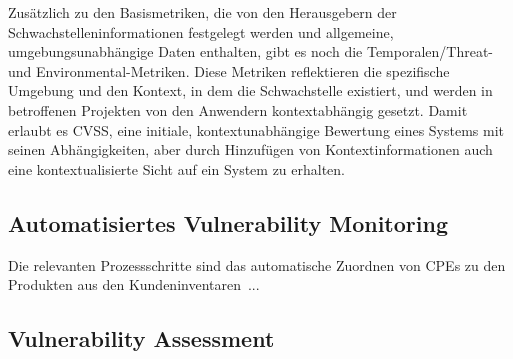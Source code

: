 Zusätzlich zu den Basismetriken, die von den Herausgebern der Schwachstelleninformationen festgelegt werden und allgemeine, umgebungsunabhängige Daten enthalten, gibt es noch die Temporalen/Threat- und Environmental-Metriken.
Diese Metriken reflektieren die spezifische Umgebung und den Kontext, in dem die Schwachstelle existiert, und werden in betroffenen Projekten von den Anwendern kontextabhängig gesetzt.
Damit erlaubt es CVSS, eine initiale, kontextunabhängige Bewertung eines Systems mit seinen Abhängigkeiten, aber durch Hinzufügen von Kontextinformationen auch eine kontextualisierte Sicht auf ein System zu erhalten.

\subsection{Automatisiertes Vulnerability Monitoring} \label{subsec:projektbericht-grundlagen-vulnerability-monitoring}

Die relevanten Prozessschritte sind das automatische Zuordnen von CPEs zu den Produkten aus den Kundeninventaren ...

\subsection{Vulnerability Assessment} \label{subsec:projektbericht-grundlagen-vulnerability-assessment}
